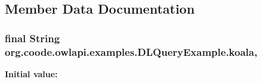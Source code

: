 \subsection{Member Data Documentation}
\hypertarget{classorg_1_1coode_1_1owlapi_1_1examples_1_1_d_l_query_example_a382847000e0c561ec11b1958165f5642}{
\subsubsection[{koala}]{\setlength{\rightskip}{0pt plus 5cm}final String org.\-coode.\-owlapi.\-examples.\-D\-L\-Query\-Example.\-koala\hspace{0.3cm}{\ttfamily [static]}, {\ttfamily [private]}}}\label{classorg_1_1coode_1_1owlapi_1_1examples_1_1_d_l_query_example_a382847000e0c561ec11b1958165f5642}
{\bfseries Initial value\-:}
